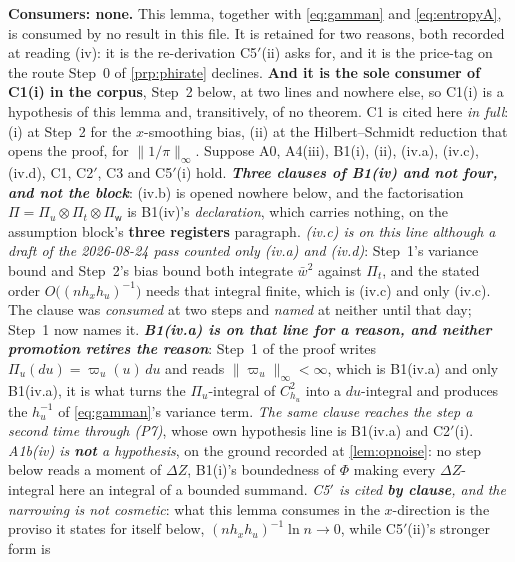 \begin{lemma}\label{lem:aerr}
\textbf{Consumers: none.} This lemma, together with \eqref{eq:gamman} and \eqref{eq:entropyA},
is consumed by no result in this file. It is
retained for two reasons, both recorded at reading (iv): it is the re-derivation C5$'$(ii) asks for,
and it is the price-tag on the route Step~0 of \cref{prp:phirate} declines.
\textbf{And it is the sole consumer of C1(i) in the corpus}, Step~2 below, at two lines and nowhere
else, so C1(i) is a hypothesis of this lemma and, transitively, of no theorem. C1 is
cited here \emph{in full}: (i) at Step~2 for the $x$-smoothing bias, (ii) at the
Hilbert--Schmidt reduction that opens the proof, for $\|1/\pi\|_\infty$.
Suppose A0, A4(iii), B1(i), (ii), (iv.a), (iv.c), (iv.d), C1, C2$'$, C3 and C5$'$(i) hold.
\emph{\textbf{Three clauses of B1(iv) and not four, and not the block}}: \textup{(iv.b)} is opened
nowhere below, and the factorisation $\Pi=\Pi_u\otimes\Pi_t\otimes\Pi_{\mathsf w}$ is B1(iv)'s
\emph{declaration}, which carries nothing, on the assumption block's \textbf{three registers} paragraph.
\emph{\textup{(iv.c)} is on this line although a draft of the 2026-08-24 pass counted only
\textup{(iv.a)} and \textup{(iv.d)}}: Step~1's variance bound and Step~2's bias bound both integrate
$\bar w^{2}$ against $\Pi_t$, and the stated order $O\big((nh_xh_u)^{-1}\big)$ needs that integral
finite, which is \textup{(iv.c)} and only \textup{(iv.c)}. The clause was \emph{consumed} at two steps
and \emph{named} at neither until that day; Step~1 now names it.
\emph{\textbf{B1(iv.a) is on that line for a reason, and neither promotion retires the reason}}: Step~1 of the
proof writes $\Pi_u(du)=\varpi_u(u)\,du$ and reads $\|\varpi_u\|_\infty<\infty$, which is B1(iv.a) and only
B1(iv.a), it is what turns the $\Pi_u$-integral of $C_{h_u}^{2}$ into a $du$-integral and produces the
$h_u^{-1}$ of \eqref{eq:gamman}'s variance term. \emph{The same clause reaches the step a second time
through \textup{(P7)}}, whose own hypothesis line is B1(iv.a) and C2$'$(i).
\emph{A1b(iv) is \textbf{not} a hypothesis}, on the ground recorded at
\cref{lem:opnoise}: no step below reads a moment of $\Delta Z$, B1(i)'s boundedness of $\Phi$ making every
$\Delta Z$-integral here an integral of a bounded summand.
\emph{C5$'$ is cited \textbf{by clause}, and the narrowing is not cosmetic}: what this lemma consumes in
the $x$-direction
is the proviso it states for itself below, $(nh_xh_u)^{-1}\ln n\to0$, while C5$'$(ii)'s stronger form is

\end{lemma}
